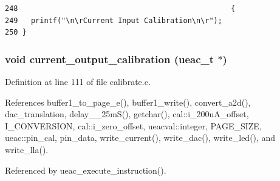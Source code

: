 \footnotesize\begin{verbatim}248                                                 {
249   printf("\n\rCurrent Input Calibration\n\r");
250 }
\end{verbatim}\normalsize 


\subsubsection{\setlength{\rightskip}{0pt plus 5cm}void current\_\-output\_\-calibration ({\bf ueac\_\-t} $\ast$)}\label{calibrate_8h_a0}




Definition at line 111 of file calibrate.c.

References buffer1\_\-to\_\-page\_\-e(), buffer1\_\-write(), convert\_\-a2d(), dac\_\-translation, delay\_\_\-25m\-S(), getchar(), cal::i\_\-200u\-A\_\-offset, I\_\-CONVERSION, cal::i\_\-zero\_\-offset, ueacval::integer, PAGE\_\-SIZE, ueac::pin\_\-cal, pin\_\-data, write\_\-current(), write\_\-dac(), write\_\-led(), and write\_\-lla().

Referenced by ueac\_\-execute\_\-instruction().

